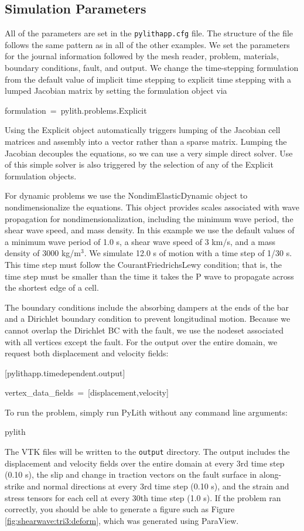 \subsection{Simulation Parameters}

All of the parameters are set in the \texttt{pylithapp.cfg} file.
The structure of the file follows the same pattern as in all of the
other examples. We set the parameters for the journal information
followed by the mesh reader, problem, materials, boundary conditions,
fault, and output. We change the time-stepping formulation from the
default value of implicit time stepping to explicit time stepping
with a lumped Jacobian matrix by setting the formulation object via
\begin{lyxcode}
formulation~=~pylith.problems.Explicit
\end{lyxcode}
Using the Explicit object automatically triggers lumping of the Jacobian
cell matrices and assembly into a vector rather than a sparse matrix.
Lumping the Jacobian decouples the equations, so we can use a very
simple direct solver. Use of this simple solver is also triggered
by the selection of any of the Explicit formulation objects. 

For dynamic problems we use the NondimElasticDynamic object to nondimensionalize
the equations. This object provides scales associated with wave propagation
for nondimensionalization, including the minimum wave period, the
shear wave speed, and mass density. In this example we use the default
values of a minimum wave period of 1.0 s, a shear wave speed of 3
km/s, and a mass density of 3000 kg/m$^{3}$. We simulate 12.0 s of
motion with a time step of 1/30 s. This time step must follow the
Courant\textendash{}Friedrichs\textendash{}Lewy condition; that is,
the time step must be smaller than the time it takes the P wave to
propagate across the shortest edge of a cell. 

The boundary conditions include the absorbing dampers at the ends
of the bar and a Dirichlet boundary condition to prevent longitudinal
motion. Because we cannot overlap the Dirichlet BC with the fault,
we use the nodeset associated with all vertices except the fault.
For the output over the entire domain, we request both displacement
and velocity fields:
\begin{lyxcode}
{[}pylithapp.timedependent.output{]}

vertex\_data\_fields~=~{[}displacement,velocity{]}
\end{lyxcode}
To run the problem, simply run PyLith without any command line arguments:
\begin{lyxcode}
pylith
\end{lyxcode}
The VTK files will be written to the \texttt{output} directory. The
output includes the displacement and velocity fields over the entire
domain at every 3rd time step (0.10 s), the slip and change in traction
vectors on the fault surface in along-strike and normal directions
at every 3rd time step (0.10 s), and the strain and stress tensors
for each cell at every 30th time step (1.0 s). If the problem ran
correctly, you should be able to generate a figure such as Figure
\ref{fig:shearwave:tri3:deform}, which was generated using ParaView.

